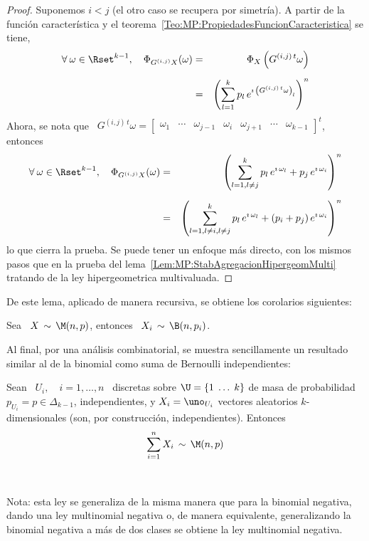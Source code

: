 \begin{proof}
  Suponemos $i <  j$ (el otro caso  se recupera por simetr\'ia). A  partir de la
  funci\'on                 caracter\'istica                 y                el
  teorema~\ref{Teo:MP:PropiedadesFuncionCaracteristica} se tiene,
  \begin{eqnarray*}
  \forall \: \omega \in \Rset^{k-1}, \quad \Phi_{G^{(i,j)} X}(\omega) & = &
  \Phi_X\left( G^{(i,j) \, t} \omega \right)\\[2mm]
  & = & \left( \sum_{l=1}^k p_l \, e^{\imath \, \left( G^{(i,j) \, t} \omega \right)_l } \right)^n
  \end{eqnarray*}
  Ahora,  se nota  que \  $G^{(i,j) \,  t} \omega  = \begin{bmatrix}  \omega_1 &
    \cdots    &   \omega_{j-1}   &    \omega_i   &    \omega_{j+1}   &    \cdots   &
    \omega_{k-1} \end{bmatrix}^t$, entonces
  \begin{eqnarray*}
  \forall \: \omega \in \Rset^{k-1}, \quad \Phi_{G^{(i,j)} X}(\omega) & = &
  \left( \sum_{l=1, l \ne j}^k p_l \, e^{\imath \, \omega_l} + p_j \, e^{\imath \,
  \omega_i } \right)^n\\[2mm]
  & = & \left( \sum_{l=1, l \ne i, l \ne j}^k p_l \, e^{\imath \, \omega_l} +
  (p_i+p_j) \, e^{\imath \, \omega_i } \right)^n
  \end{eqnarray*}
  lo que  cierra la  prueba. Se puede  tener un  enfoque m\'as directo,  con los
  mismos         pasos        que         en        la         prueba        del
  lema~\ref{Lem:MP:StabAgregacionHipergeomMulti}    tratando     de    la    ley
  hipergeometrica multivaluada.
\end{proof}

De este lema, aplicado de manera recursiva, se obtiene los corolarios siguientes:
%
\begin{corolario}\label{Cor:MP:MarginalMultinomial}
%
  Sea  \ $X  \,  \sim \,  \M(n,p)$, entonces  \  $\displaystyle X_i  \, \sim  \,
  \B(n,p_i)$.
\end{corolario}


Al  final,  por  una  an\'alisis  combinatorial,  se  muestra  sencillamente  un
resultado similar al de la binomial como suma de Bernoulli independientes:
%
\begin{lema}\label{Lem:MultinomialSumaMultiBernoulli}
%
  Sean \ $U_i, \quad i  = 1, \ldots , n$ \ discretas sobre $\U  = \{ 1 \; \ldots
  \;  k   \}$  de  masa  de   probabilidad  $p_{U_i}  =   p  \in  \Delta_{k-1}$,
  independientes, y $X_i  = \uno_{U_i}$ vectores aleatorios $k$-dimensionales
  (son, por construcci\'on, independientes). Entonces
  \[
  \sum_{i=1}^n X_i \, \sim \, \M(n,p)
  \]
\end{lema}

\

Nota: esta ley  se generaliza de la misma manera que  para la binomial negativa,
dando una  ley multinomial negativa  o, de manera equivalente,  generalizando la
binomial  negativa  a  m\'as  de  dos  clases  se  obtiene  la  ley  multinomial
negativa. 
